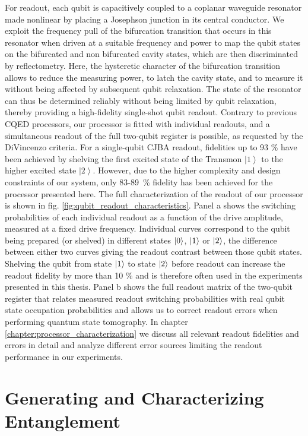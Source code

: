 For readout, each qubit is capacitively coupled to
a coplanar waveguide resonator made nonlinear by placing a Josephson
junction in its central conductor. We exploit the frequency pull of
the bifurcation transition that occurs in this resonator when driven
at a suitable frequency and power to map the qubit
states on the bifurcated and non bifurcated cavity states, which are
then discriminated by reflectometry. Here, the hysteretic
character of the bifurcation transition allows to reduce the measuring
power, to latch the cavity state, and to measure it without being
affected by subsequent qubit relaxation. The state of the resonator
can thus be determined reliably without being limited by qubit relaxation,
thereby providing a high-fidelity single-shot qubit readout. Contrary
to previous CQED processors, our processor is fitted with individual
readouts, and a simultaneous readout of the full two-qubit register
is possible, as requested by the DiVincenzo criteria. For a single-qubit
CJBA readout, fidelities up to 93 \% have been achieved
\citep{mallet_single-shot_2009} by shelving the first excited state
of the Transmon $\left|1\right\rangle $ to the higher
excited state $\left|2\right\rangle $. However, due to the higher
complexity and design constraints of our system, only \mbox{83-89 \%} fidelity
has been achieved for the processor presented here. The full characterization
of the readout of our processor is shown in fig.
\ref{fig:qubit_readout_characteristics}. Panel a
shows the switching probabilities of each individual
readout as a function of the drive amplitude, measured at a fixed
drive frequency. Individual curves correspond to the qubit being prepared
(or shelved) in different states $\left| 0 \right>$, $\left| 1 \right>$
or $\left| 2 \right>$, the difference between either two curves giving the
readout contrast between those qubit states. Shelving
the qubit from state $\left| 1 \right>$ to state $\left| 2 \right>$ before readout
can increase the readout fidelity by more than 10 \% and is therefore
often used in the experiments presented in this thesis. Panel b shows the full readout matrix
of the two-qubit register that relates measured readout switching
probabilities with real qubit state occupation probabilities and allows
us to correct readout errors when performing quantum state tomography.
In chapter \ref{chapter:processor_characterization} we discuss all relevant readout fidelities
and errors in detail and analyze different error sources limiting
the readout performance in our experiments.


\section{Generating and Characterizing Entanglement}

